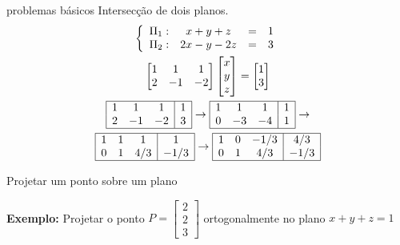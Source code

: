 \documentclass{beamer}
\begin{document}
\begin{frame}{problemas básicos}
Intersecção de dois planos.
\begin{gather*}
  \left\{ \begin{array}{lccc}
    \Pi_1: & x+y+z & = & 1 \\
    \Pi_2: & 2x-y-2z& = & 3
  \end{array}\right. \\
  \begin{bmatrix}
    1 & 1 & 1 \\
    2 & -1 & -2
  \end{bmatrix}\begin{bmatrix}
    x \\ y \\ z
  \end{bmatrix} = \begin{bmatrix}
    1 \\ 3
  \end{bmatrix} \\
  \begin{array}{|ccc|c|}\hline
    1 & 1 & 1 & 1 \\
    2 & -1 & -2 & 3 \\ \hline
  \end{array} \to \begin{array}{|ccc|c|}\hline
    1 & 1 & 1 & 1 \\
    0 & -3 & -4 & 1 \\ \hline
  \end{array} \to \\
  \begin{array}{|ccc|c|}\hline
    1 & 1 & 1 & 1 \\
    0 & 1 & 4/3& -1/3\\ \hline
  \end{array} \to \begin{array}{|ccc|c|}\hline
    1 & 0 & -1/3 & 4/3 \\
    0 & 1 & 4/3& -1/3\\ \hline
  \end{array} 
\end{gather*}
  
\end{frame}

\begin{frame}
  Projetar um ponto sobre um plano

\textbf{Exemplo:} Projetar o ponto $P = \begin{bmatrix}
  2 \\ 2 \\ 3
\end{bmatrix}$ ortogonalmente no plano $x+y+z=1$

\end{frame}
\end{document}
